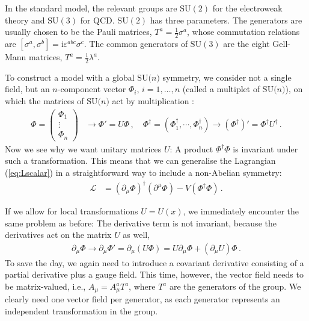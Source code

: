 \documentclass[12pt]{report}
\renewcommand{\L}{\ensuremath{\mathscr{L}}}
\newcommand{\sun}{\ensuremath{\mathrm{SU(}n\mathrm{)}}}
\newcommand{\sutwo}{\ensuremath{\mathrm{SU(2)}}}
\newcommand{\suthree}{\ensuremath{\mathrm{SU(3)}}}
\renewcommand{\i}{\ensuremath{\text{i}}}
\newcommand{\2}{\ensuremath{\sqrt{2}\,}}
\renewcommand{\L}{\ensuremath{\mathscr{L}}}
\begin{document}
{      In the standard model, the relevant groups are $\sutwo$ for the electroweak theory and
      $\suthree$ for QCD. $\sutwo$ has three parameters. The generators are usually
      chosen to be the Pauli matrices,
      $T^a=\frac{1}{2}\sigma^a$, whose commutation relations are 
      $\left[\sigma^a,\sigma^b\right]=\i \varepsilon^{abc}\sigma^c$. The common generators of
      $\suthree$ are the eight Gell-Mann matrices,
      $T^a=\frac{1}{2}\lambda^a$.
      
      To construct a model with a global $\sun$ symmetry, we consider not a single
      field, but an $n$-component vector $\Phi_i$, $i=1,\ldots,n$ (called a multiplet of $\sun$),
      on which the matrices of $\sun$ act by multiplication :
      \begin{align}
        \Phi=
        \begin{pmatrix}
          \Phi_1\\ \vdots \\\Phi_n
        \end{pmatrix}
        &\longrightarrow \Phi' = U \Phi\,, \quad 
        \Phi^\dagger=\left(\Phi_1^\dagger,\cdots,\Phi_n^\dagger\right) \longrightarrow
        \left(\Phi^\dagger\right)'=\Phi^\dagger U^\dagger \,.
      \end{align}
      Now we see why we want unitary matrices $U$: A product $\Phi^\dagger\Phi$ is
      invariant under such a transformation. This means that we can generalise the Lagrangian
      (\ref{eq:Lscalar}) in a straightforward way to include a non-Abelian symmetry:
      \begin{align}
        \L&= \left(\partial_\mu \Phi\right)^\dagger\!\left(\partial^\mu \Phi\right)
        -V\left(\Phi^\dagger\Phi\right) \,.
      \end{align}
      
      If we allow for local transformations $U=U(x)$, we immediately encounter the same problem as
      before: The derivative term is not invariant, because the derivatives act on the matrix $U$
      as well,
      \begin{align}
        \partial_\mu \Phi \to \partial_\mu\Phi' = \partial_\mu\left(U\Phi\right)=U\partial_\mu \Phi
        +\left(\partial_\mu U\right) \Phi\,.
      \end{align}
      To save the day, we again need to introduce a covariant derivative consisting of a partial
      derivative plus a gauge field.  This time, however, the
      vector field needs to be matrix-valued, i.e., $A_\mu = A_\mu^a T^a$, where $T^a$ are the
      generators of the group. We clearly need one vector field per
      generator, as each generator represents an independent transformation in the group. 
        
}
\end{document}
